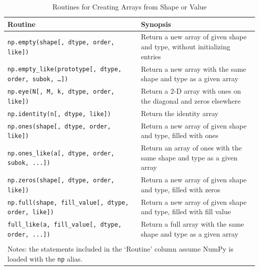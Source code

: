 \documentclass[a4paper,11pt]{book}
\begin{document}
\begin{table}
	\centering
	\caption{Routines for Creating Arrays from Shape or Value}
	\label{tab:array_from_shape_or_value}
	\begin{tabular}{lp{12cm}}
		\toprule \toprule
			Routine & Synopsis \\
			\midrule
			\texttt{np.empty(shape[, dtype, order, like])} & Return a new array of given shape and type, without initializing entries \\
			\texttt{np.empty\_like(prototype[, dtype, order, subok, \ldots])} & Return a new array with the same shape and type as a given array \\
			\texttt{np.eye(N[, M, k, dtype, order, like])} & Return a 2-D array with ones on the diagonal and zeros elsewhere\\
			\texttt{np.identity(n[, dtype, like])} & Return the identity array \\
			\texttt{np.ones(shape[, dtype, order, like])} & Return a new array of given shape and type, filled with ones \\
			\texttt{np.ones\_like(a[, dtype, order, subok, ...])} & Return an array of ones with the same shape and type as a given array \\
			\texttt{np.zeros(shape[, dtype, order, like])} & Return a new array of given shape and type, filled with zeros \\
			\texttt{np.full(shape, fill\_value[, dtype, order, like])} & Return a new array of given shape and type, filled with fill value \\
			\texttt{full\_like(a, fill\_value[, dtype, order, ...])} & Return a full array with the same shape and type as a given array \\
	     	\bottomrule \\[-1.8ex]
	        \multicolumn{2}{l}{Notes: the statements included in the `Routine' column assume NumPy is loaded with the \texttt{np} alias.} \\
	\end{tabular}
\end{table}
\end{document}
